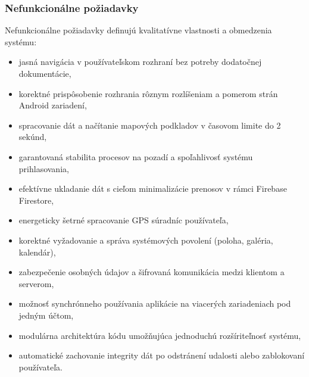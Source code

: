 \subsubsection{Nefunkcionálne požiadavky}
Nefunkcionálne požiadavky definujú kvalitatívne vlastnosti a obmedzenia systému:

\begin{itemize}[noitemsep]
    \item jasná navigácia v používateľskom rozhraní bez potreby dodatočnej dokumentácie,
    \item korektné prispôsobenie rozhrania rôznym rozlíšeniam a pomerom strán Android zariadení,
    \item spracovanie dát a načítanie mapových podkladov v časovom limite do 2 sekúnd,
    \item garantovaná stabilita procesov na pozadí a spoľahlivosť systému prihlasovania,
    \item efektívne ukladanie dát s cieľom minimalizácie prenosov v rámci Firebase Firestore,
    \item energeticky šetrné spracovanie GPS súradníc používateľa,
    \item korektné vyžadovanie a správa systémových povolení (poloha, galéria, kalendár),
    \item zabezpečenie osobných údajov a šifrovaná komunikácia medzi klientom a serverom,
    \item možnosť synchrónneho používania aplikácie na viacerých zariadeniach pod jedným účtom,
    \item modulárna architektúra kódu umožňujúca jednoduchú rozšíriteľnosť systému,
    \item automatické zachovanie integrity dát po odstránení udalosti alebo zablokovaní používateľa.
\end{itemize}


%
%
%


